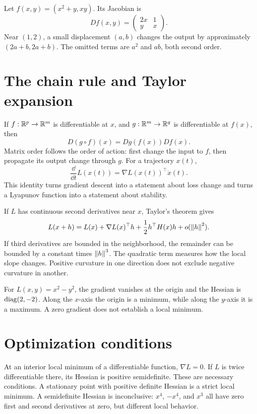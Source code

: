 \begin{example}
Let \(f(x,y)=(x^2+y,xy)\). Its Jacobian is
\[
Df(x,y)=\begin{pmatrix}2x&1\\y&x\end{pmatrix}.
\]
Near \((1,2)\), a small displacement \((a,b)\) changes the output by approximately \((2a+b,2a+b)\). The omitted terms are \(a^2\) and \(ab\), both second order.
\end{example}

\section{The chain rule and Taylor expansion}
If \(f:\mathbb{R}^p\to\mathbb{R}^m\) is differentiable at \(x\), and \(g:\mathbb{R}^m\to\mathbb{R}^q\) is differentiable at \(f(x)\), then
\[
D(g\circ f)(x)=Dg(f(x))Df(x).
\]
Matrix order follows the order of action: first change the input to \(f\), then propagate its output change through \(g\). For a trajectory \(x(t)\),
\[
\frac{\dd}{\dd t}L(x(t))
=\nabla L(x(t))^\top\dot x(t).
\]
This identity turns gradient descent into a statement about loss change and turns a Lyapunov function into a statement about stability.

If \(L\) has continuous second derivatives near \(x\), Taylor's theorem gives
\[
L(x+h)=L(x)+\nabla L(x)^\top h
+\frac12h^\top H(x)h+o(\left\lVert h\right\rVert^2).
\]
If third derivatives are bounded in the neighborhood, the remainder can be bounded by a constant times \(\left\lVert h\right\rVert^3\). The quadratic term measures how the local slope changes. Positive curvature in one direction does not exclude negative curvature in another.

\begin{example}[A saddle]
For \(L(x,y)=x^2-y^2\), the gradient vanishes at the origin and the Hessian is \(\operatorname{diag}(2,-2)\). Along the \(x\)-axis the origin is a minimum, while along the \(y\)-axis it is a maximum. A zero gradient does not establish a local minimum.
\end{example}

\section{Optimization conditions}
At an interior local minimum of a differentiable function, \(\nabla L=0\). If \(L\) is twice differentiable there, its Hessian is positive semidefinite. These are necessary conditions. A stationary point with positive definite Hessian is a strict local minimum. A semidefinite Hessian is inconclusive: \(x^4\), \(-x^4\), and \(x^3\) all have zero first and second derivatives at zero, but different local behavior.

